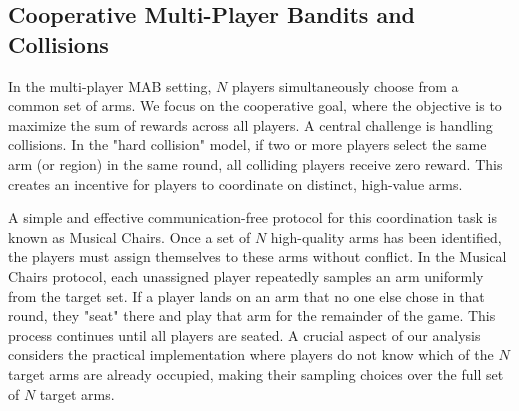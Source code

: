 \subsection{Cooperative Multi-Player Bandits and Collisions}
In the multi-player MAB setting, $N$ players simultaneously choose from a common set of arms. We focus on the cooperative goal, where the objective is to maximize the sum of rewards across all players. A central challenge is handling collisions. In the "hard collision" model, if two or more players select the same arm (or region) in the same round, all colliding players receive zero reward. This creates an incentive for players to coordinate on distinct, high-value arms.

A simple and effective communication-free protocol for this coordination task is known as Musical Chairs. Once a set of $N$ high-quality arms has been identified, the players must assign themselves to these arms without conflict. In the Musical Chairs protocol, each unassigned player repeatedly samples an arm uniformly from the target set. If a player lands on an arm that no one else chose in that round, they "seat" there and play that arm for the remainder of the game. This process continues until all players are seated. A crucial aspect of our analysis considers the practical implementation where players do not know which of the $N$ target arms are already occupied, making their sampling choices over the full set of $N$ target arms.
